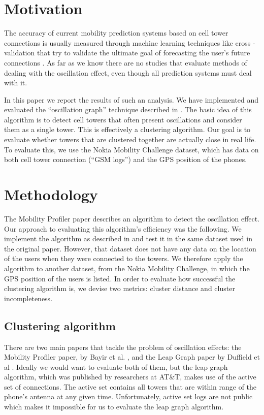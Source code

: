 \documentclass[letterpaper, 12pt, conference]{ieeeconf}
\begin{document}
\section{Motivation}

The accuracy of current mobility prediction systems based on cell tower 
connections is usually measured through machine learning techniques like cross
-validation that try to validate the ultimate goal of forecasting the user's 
future connections \cite{LeapGraph}. As far as we know there are no studies 
that evaluate methods of dealing with the oscillation effect, even though all 
prediction systems must deal with it.

In this paper we report the results of such an analysis. We have implemented 
and evaluated the ``oscillation graph'' technique described in \cite{
mobilityprofiler}. The basic idea of this algorithm is to detect cell towers 
that often present oscillations and consider them as a single tower. This is 
effectively a clustering algorithm. Our goal is to evaluate whether towers 
that are clustered together are actually close in real life. To evaluate 
this, we use the Nokia Mobility Challenge dataset, which has data on both 
cell tower connection (``GSM logs'') and the GPS position of the phones.

\section{Methodology}
\label{sec:methodology}

The Mobility Profiler paper \cite{mobilityprofiler} describes an algorithm to 
detect the oscillation effect. Our approach to evaluating this algorithm's 
efficiency was the following. We implement the algorithm as described in \cite
{mobilityprofiler} and test it in the same dataset used in the original 
paper. However, that dataset does not have any data on the location of the 
users when they were connected to the towers. We therefore apply the 
algorithm to another dataset, from the Nokia Mobility Challenge, in which the 
GPS position of the users is listed. In order to evaluate how successful the 
clustering algorithm is, we devise two metrics: cluster distance and cluster 
incompleteness.

\subsection{Clustering algorithm}

There are two main papers that tackle the problem of oscillation effects: the 
Mobility Profiler paper, by Bayir et al. \cite{mobilityprofiler}, and the 
Leap Graph paper by Duffield et al \cite{LeapGraph}. Ideally we would want to 
evaluate both of them, but the leap graph algorithm, which was published by 
researchers at AT\&T, makes use of the active set of connections. The active 
set contains all towers that are within range of the phone's antenna at any 
given time. Unfortunately, active set logs are not public which makes it 
impossible for us to evaluate the leap graph algorithm.
\end{document}
